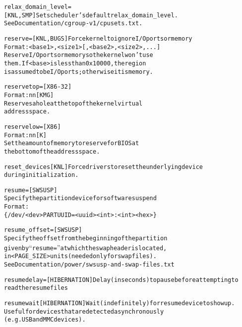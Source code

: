 \documentclass[a4paper,8pt,english]{sphinxmanual}
\begin{document}
\begin{alltt}
        relax\_domain\_level=
                        {[}KNL, SMP{]} Set scheduler's default relax\_domain\_level.
                        See Documentation/cgroup-v1/cpusets.txt.

        reserve=        {[}KNL,BUGS{]} Force kernel to ignore I/O ports or memory
                        Format: \textless{}base1\textgreater{},\textless{}size1\textgreater{}{[},\textless{}base2\textgreater{},\textless{}size2\textgreater{},...{]}
                        Reserve I/O ports or memory so the kernel won't use
                        them.  If \textless{}base\textgreater{} is less than 0x10000, the region
                        is assumed to be I/O ports; otherwise it is memory.

        reservetop=     {[}X86-32{]}
                        Format: nn{[}KMG{]}
                        Reserves a hole at the top of the kernel virtual
                        address space.

        reservelow=     {[}X86{]}
                        Format: nn{[}K{]}
                        Set the amount of memory to reserve for BIOS at
                        the bottom of the address space.

        reset\_devices   {[}KNL{]} Force drivers to reset the underlying device
                        during initialization.

        resume=         {[}SWSUSP{]}
                        Specify the partition device for software suspend
                        Format:
                        \{/dev/\textless{}dev\textgreater{} \textbar{} PARTUUID=\textless{}uuid\textgreater{} \textbar{} \textless{}int\textgreater{}:\textless{}int\textgreater{} \textbar{} \textless{}hex\textgreater{}\}

        resume\_offset=  {[}SWSUSP{]}
                        Specify the offset from the beginning of the partition
                        given by ``resume='' at which the swap header is located,
                        in \textless{}PAGE\_SIZE\textgreater{} units (needed only for swap files).
                        See  Documentation/power/swsusp-and-swap-files.txt

        resumedelay=    {[}HIBERNATION{]} Delay (in seconds) to pause before attempting to
                        read the resume files

        resumewait      {[}HIBERNATION{]} Wait (indefinitely) for resume device to show up.
                        Useful for devices that are detected asynchronously
                        (e.g. USB and MMC devices).


\end{alltt}
\end{document}

